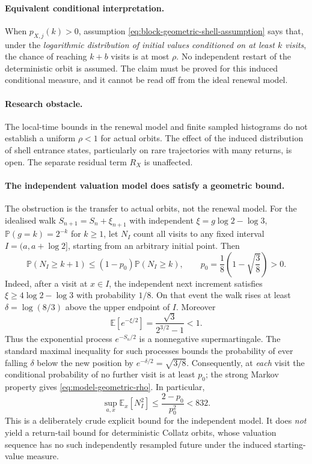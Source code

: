 \paragraph{Equivalent conditional interpretation.}
When $p_{X,j}(k)>0$, assumption
\eqref{eq:block-geometric-shell-assumption} says that, under the
\emph{logarithmic distribution of initial values conditioned on at
least $k$ visits}, the chance of reaching $k+b$ visits is at most
$\rho$. No independent restart of the deterministic orbit is
assumed. The claim must be proved for this induced conditional
measure, and it cannot be read off from the ideal renewal model.

\paragraph{Research obstacle.}
The local-time bounds in the renewal model and finite sampled
histograms do not establish a uniform $\rho<1$ for actual orbits.
The effect of the induced distribution of shell entrance states,
particularly on rare trajectories with many returns, is open.
The separate residual term $R_X$ is unaffected.

\paragraph{The independent valuation model does satisfy a geometric bound.}
The obstruction is the transfer to actual orbits, not the renewal model.
For the idealised walk $S_{n+1}=S_n+\xi_{n+1}$ with independent
$\xi=g\log2-\log3$, $\mathbb P(g=k)=2^{-k}$ for $k\ge1$,
let $N_I$ count all visits to any fixed interval
$I=(a,a+\log2]$, starting from an arbitrary initial point.
Then
\begin{equation}\label{eq:model-geometric-rho}
 \mathbb P(N_I\ge k+1)\le (1-p_0)\mathbb P(N_I\ge k),
 \qquad
 p_0=\frac18\left(1-\sqrt{\frac38}\right)>0.
\end{equation}
Indeed, after a visit at $x\in I$, the independent next increment
satisfies $\xi\ge4\log2-\log3$ with probability $1/8$.
On that event the walk rises at least
$\delta=\log(8/3)$ above the upper endpoint of $I$.
Moreover
\[
 \mathbb E[e^{-\xi/2}]
 =\frac{\sqrt3}{2^{3/2}-1}<1.
\]
Thus the exponential process $e^{-S_n/2}$ is a nonnegative
supermartingale. The standard maximal inequality for such processes
bounds the probability of ever falling $\delta$ below the new
position by $e^{-\delta/2}=\sqrt{3/8}$. Consequently, at
\emph{each} visit the conditional probability of no further visit
is at least $p_0$; the strong Markov property gives
\eqref{eq:model-geometric-rho}. In particular,
\[
 \sup_{a,x}\mathbb E_x[N_I^2]
 \le\frac{2-p_0}{p_0^2}<832.
\]
This is a deliberately crude explicit bound for the independent
model. It does \emph{not} yield a return-tail bound for deterministic
Collatz orbits, whose valuation sequence has no such independently
resampled future under the induced starting-value measure.
